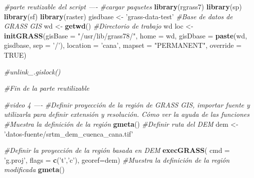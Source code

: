 \documentclass[11pt,]{article}
\newenvironment{Shaded}{\begin{snugshade}}{\end{snugshade}}
\newcommand{\KeywordTok}[1]{\textcolor[rgb]{0.13,0.29,0.53}{\textbf{#1}}}
\newcommand{\DataTypeTok}[1]{\textcolor[rgb]{0.13,0.29,0.53}{#1}}
\newcommand{\StringTok}[1]{\textcolor[rgb]{0.31,0.60,0.02}{#1}}
\newcommand{\CommentTok}[1]{\textcolor[rgb]{0.56,0.35,0.01}{\textit{#1}}}
\newcommand{\OtherTok}[1]{\textcolor[rgb]{0.56,0.35,0.01}{#1}}
\newcommand{\NormalTok}[1]{#1}
\begin{document}
\begin{Shaded}
\begin{Highlighting}[]
\CommentTok{#parte reutizable del script ----}
\CommentTok{#cargar paquetes}
\KeywordTok{library}\NormalTok{(rgrass7)}
\KeywordTok{library}\NormalTok{(sp)}
\KeywordTok{library}\NormalTok{(sf)}
\KeywordTok{library}\NormalTok{(raster)}
\NormalTok{gisdbase <-}\StringTok{ 'grass-data-test'} \CommentTok{#Base de datos de GRASS GIS}
\NormalTok{wd <-}\StringTok{ }\KeywordTok{getwd}\NormalTok{() }\CommentTok{#Directorio de trabajo}
\NormalTok{wd}
\NormalTok{loc <-}\StringTok{ }\KeywordTok{initGRASS}\NormalTok{(}\DataTypeTok{gisBase =} \StringTok{"/usr/lib/grass78/"}\NormalTok{,}
                 \DataTypeTok{home =}\NormalTok{ wd,}
                 \DataTypeTok{gisDbase =} \KeywordTok{paste}\NormalTok{(wd, gisdbase, }\DataTypeTok{sep =} \StringTok{'/'}\NormalTok{),}
                 \DataTypeTok{location =} \StringTok{'cana'}\NormalTok{,}
                 \DataTypeTok{mapset =} \StringTok{"PERMANENT"}\NormalTok{,}
                 \DataTypeTok{override =} \OtherTok{TRUE}\NormalTok{)}

\CommentTok{#unlink_.gislock()}

\CommentTok{#Fin de la parte reutilizable}

\CommentTok{#video 4 ----}
\CommentTok{#Definir proyección de la región de GRASS GIS, importar fuente y utilizarla para definir extensión y resolución. Cómo ver la ayuda de las funciones}
\CommentTok{#Muestra la definición de la región}
\KeywordTok{gmeta}\NormalTok{()}
\CommentTok{#Definir ruta del DEM}
\NormalTok{dem <-}\StringTok{ 'datos-fuente/srtm_dem_cuenca_cana.tif'}

\CommentTok{#Definir la proyección de la región basada en DEM}
\KeywordTok{execGRASS}\NormalTok{(}
  \DataTypeTok{cmd =} \StringTok{'g.proj'}\NormalTok{,}
  \DataTypeTok{flags =} \KeywordTok{c}\NormalTok{(}\StringTok{'t'}\NormalTok{,}\StringTok{'c'}\NormalTok{),}
  \DataTypeTok{georef=}\NormalTok{dem)}
\CommentTok{#Muestra la definición de la región modificada}
\KeywordTok{gmeta}\NormalTok{()}


\end{Highlighting}
\end{Shaded}
\end{document}
